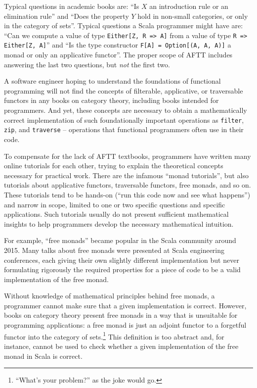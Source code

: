 Typical questions in academic books are: ``Is $X$ an introduction
rule or an elimination rule'' and ``Does the property $Y$ hold
in non-small categories, or only in the category of sets''. Typical
questions a Scala programmer might have are: ``Can we compute a value
of type \lstinline!Either[Z, R => A]!
from a value of type \lstinline!R => Either[Z, A]!''
and ``Is the type constructor \lstinline!F[A] = Option[(A, A, A)]!
a monad or only an applicative functor''. The proper scope of AFTT
includes answering the last two questions, but \emph{not} the first
two.

A software engineer hoping to understand the foundations of functional
programming will not find the concepts of filterable, applicative,
or traversable functors in any books on category theory, including
books intended for programmers. And yet, these concepts are necessary
to obtain a mathematically correct implementation of such foundationally
important operations as \lstinline!filter!,
\lstinline!zip!, and \lstinline!traverse!
– operations that functional programmers often use in their code.

To compensate for the lack of AFTT textbooks, programmers have written
many online tutorials for each other, trying to explain the theoretical
concepts necessary for practical work. There are the infamous ``monad
tutorials'', but also tutorials about applicative functors, traversable
functors, free monads, and so on. These tutorials tend to be hands-on
(``run this code now and see what happens'') and narrow in scope,
limited to one or two specific questions and specific applications.
Such tutorials usually do not present sufficient mathematical insights
to help programmers develop the necessary mathematical intuition.

For example, ``free monads'' became popular in the Scala community
around 2015. Many talks about free monads were presented at Scala
engineering conferences, each giving their own slightly different
implementation but never formulating rigorously the required properties
for a piece of code to be a valid implementation of the free monad.

Without knowledge of mathematical principles behind free monads, a
programmer cannot make sure that a given implementation is correct.
However, books on category theory present free monads in a way that
is unsuitable for programming applications: a free monad is just an
adjoint functor to a forgetful functor into the category of sets.\footnote{``What's your problem?'' as the joke would go.}
This definition is too abstract and, for instance, cannot be used
to check whether a given implementation of the free monad in Scala
is correct.

